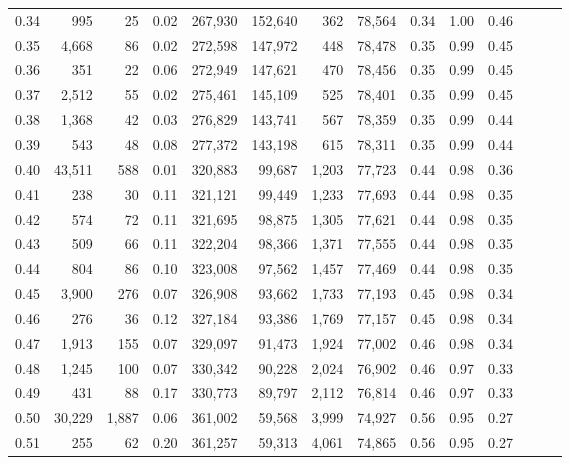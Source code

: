 \begin{tabular}{rrrrrrrrrrrrrr}
0.34 &     995 &      25 &  0.02 &  267,930 &  152,640 &     362 &  78,564 &  0.34 &  1.00 &      0.46 \\
0.35 &   4,668 &      86 &  0.02 &  272,598 &  147,972 &     448 &  78,478 &  0.35 &  0.99 &      0.45 \\
0.36 &     351 &      22 &  0.06 &  272,949 &  147,621 &     470 &  78,456 &  0.35 &  0.99 &      0.45 \\
0.37 &   2,512 &      55 &  0.02 &  275,461 &  145,109 &     525 &  78,401 &  0.35 &  0.99 &      0.45 \\
0.38 &   1,368 &      42 &  0.03 &  276,829 &  143,741 &     567 &  78,359 &  0.35 &  0.99 &      0.44 \\
0.39 &     543 &      48 &  0.08 &  277,372 &  143,198 &     615 &  78,311 &  0.35 &  0.99 &      0.44 \\
0.40 &  43,511 &     588 &  0.01 &  320,883 &   99,687 &   1,203 &  77,723 &  0.44 &  0.98 &      0.36 \\
0.41 &     238 &      30 &  0.11 &  321,121 &   99,449 &   1,233 &  77,693 &  0.44 &  0.98 &      0.35 \\
0.42 &     574 &      72 &  0.11 &  321,695 &   98,875 &   1,305 &  77,621 &  0.44 &  0.98 &      0.35 \\
0.43 &     509 &      66 &  0.11 &  322,204 &   98,366 &   1,371 &  77,555 &  0.44 &  0.98 &      0.35 \\
0.44 &     804 &      86 &  0.10 &  323,008 &   97,562 &   1,457 &  77,469 &  0.44 &  0.98 &      0.35 \\
0.45 &   3,900 &     276 &  0.07 &  326,908 &   93,662 &   1,733 &  77,193 &  0.45 &  0.98 &      0.34 \\
0.46 &     276 &      36 &  0.12 &  327,184 &   93,386 &   1,769 &  77,157 &  0.45 &  0.98 &      0.34 \\
0.47 &   1,913 &     155 &  0.07 &  329,097 &   91,473 &   1,924 &  77,002 &  0.46 &  0.98 &      0.34 \\
0.48 &   1,245 &     100 &  0.07 &  330,342 &   90,228 &   2,024 &  76,902 &  0.46 &  0.97 &      0.33 \\
0.49 &     431 &      88 &  0.17 &  330,773 &   89,797 &   2,112 &  76,814 &  0.46 &  0.97 &      0.33 \\
0.50 &  30,229 &   1,887 &  0.06 &  361,002 &   59,568 &   3,999 &  74,927 &  0.56 &  0.95 &      0.27 \\
0.51 &     255 &      62 &  0.20 &  361,257 &   59,313 &   4,061 &  74,865 &  0.56 &  0.95 &      0.27 \\

\end{tabular}
